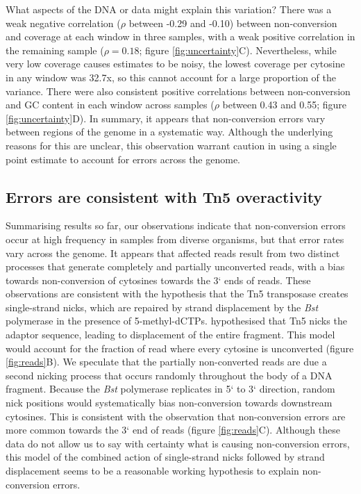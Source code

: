 \documentclass[12pt,longbibliography]{article}
\begin{document}
What aspects of the DNA or data might explain this variation?
There was a weak negative correlation ($\rho$ between -0.29 and -0.10) between non-conversion and coverage at each window in three samples, with a weak positive correlation in the remaining sample ($\rho = 0.18$; figure \ref{fig:uncertainty}C).
Nevertheless, while very low coverage causes estimates to be noisy, the lowest coverage per cytosine in any window was 32.7x, so this cannot account for a large proportion of the variance.
There were also consistent positive correlations between non-conversion and GC content in each window across samples ($\rho$ between 0.43 and 0.55; figure \ref{fig:uncertainty}D).
In summary, it appears that non-conversion errors vary between regions of the genome in a systematic way.
Although the underlying reasons for this are unclear, this observation warrant caution in using a single point estimate to account for errors across the genome.

\subsection{Errors are consistent with Tn5 overactivity}

Summarising results so far, our observations indicate that non-conversion errors occur at high frequency in samples from diverse organisms, but that error rates vary across the genome.
It appears that affected reads result from two distinct processes that generate completely and partially unconverted reads, with a bias towards non-conversion of cytosines towards the 3` ends of reads.
These observations are consistent with the hypothesis that the Tn5 transposase creates single-strand nicks, which are repaired by strand displacement by the \textit{Bst} polymerase in the presence of 5-methyl-dCTPs.
\textcite{lu2015improved} hypothesised that Tn5 nicks the adaptor sequence, leading to displacement of the entire fragment.
This model would account for the fraction of read where every cytosine is unconverted (figure \ref{fig:reads}B).
We speculate that the partially non-converted reads are due a second nicking process that occurs randomly throughout the body of a DNA fragment.
Because the \textit{Bst} polymerase replicates in 5` to 3` direction, random nick positions would systematically bias non-conversion towards downstream cytosines.
This is consistent with the observation that non-conversion errors are more common towards the 3` end of reads (figure \ref{fig:reads}C).
Although these data do not allow us to say with certainty what is causing non-conversion errors, this model of the combined action of single-strand nicks followed by strand displacement seems to be a reasonable working hypothesis to explain non-conversion errors.
\end{document}

